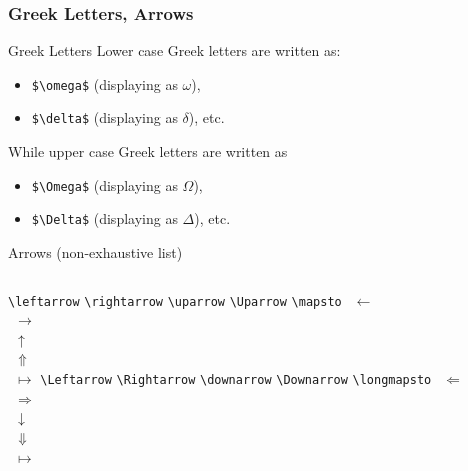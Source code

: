 \begin{frame}[fragile]
\frametitle{Greek Letters, Arrows}
\begin{block}{Greek Letters}
    Lower case Greek letters are written as:
    \begin{itemize}
        \item \verb|$\omega$| (displaying as $\omega$), 
        \item \verb|$\delta$| (displaying as $\delta$), etc.
    \end{itemize}
    While upper case Greek letters are written as 
    \begin{itemize}
        \item \verb|$\Omega$| (displaying as $\Omega$), 
        \item \verb|$\Delta$| (displaying as $\Delta$), etc.
    \end{itemize}
\end{block}  
\begin{block}{Arrows (non-exhaustive list)}
    \begin{columns}
        \verb|\leftarrow| 
        \verb|\rightarrow|
        \verb|\uparrow|
        \verb|\Uparrow|
        \verb|\mapsto|
        $~~\leftarrow$ \\
        $~~\rightarrow$\\
        $~~\uparrow$\\
        $~~\Uparrow$\\
        $~~\mapsto$
        \verb|\Leftarrow| 
        \verb|\Rightarrow|
        \verb|\downarrow|
        \verb|\Downarrow|
        \verb|\longmapsto|
        $~~\Leftarrow$ \\
        $~~\Rightarrow$\\
        $~~\downarrow$\\
        $~~\Downarrow$\\
        $~~\longmapsto$   
    \end{columns}
\end{block}
\end{frame}


